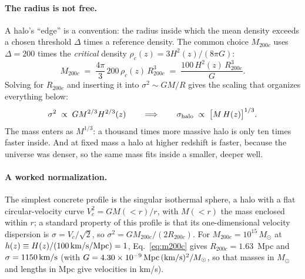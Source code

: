 \documentclass[11pt]{article}
\newcommand{\shalo}{\sigma_{\rm halo}}
\newcommand{\Msun}{M_\odot}
\newcommand{\kms}{\,{\rm km/s}}
\begin{document}
\paragraph{The radius is not free.}
A halo's ``edge'' is a convention: the radius inside which the mean
density exceeds a chosen threshold $\Delta$ times a reference density.
The common choice $M_{200c}$ uses $\Delta = 200$ times the
\emph{critical} density $\rho_c(z) = 3 H^2(z)/(8\pi G)$:
\begin{equation}
  M_{200c} \;=\; \frac{4\pi}{3}\,200\,\rho_c(z)\,R_{200c}^3
  \;=\; \frac{100\,H^2(z)\,R_{200c}^3}{G} .
  \label{eq:m200c}
\end{equation}
Solving for $R_{200c}$ and inserting it into $\sigma^2 \sim GM/R$
gives the scaling that organizes everything below:
\begin{equation}
  \sigma^2 \;\propto\; G M^{2/3} H^{2/3}(z)
  \qquad\Longrightarrow\qquad
  \shalo \;\propto\; \bigl[M\,H(z)\bigr]^{1/3} .
  \label{eq:scaling}
\end{equation}
The mass enters as $M^{1/3}$: a thousand times more massive halo is
only ten times faster inside.  And at fixed mass a halo at higher
redshift is faster, because the universe was denser, so the same mass
fits inside a smaller, deeper well.

\paragraph{A worked normalization.}
The simplest concrete profile is the singular isothermal sphere, a
halo with a flat circular-velocity curve $V_c^2 = G M(<r)/r$, with
$M(<r)$ the mass enclosed within $r$; a standard property of this
profile is that its
one-dimensional velocity dispersion is $\sigma = V_c/\sqrt{2}$, so
$\sigma^2 = G M_{200c}/(2 R_{200c})$.  For
$M_{200c} = 10^{15}\,\Msun$ at $h(z) \equiv H(z)/(100\kms/{\rm Mpc})
= 1$, Eq.~\eqref{eq:m200c} gives $R_{200c} = 1.63$~Mpc and
$\sigma = 1150\kms$ (with
$G = 4.30 \times 10^{-9}\,{\rm Mpc}\,({\rm km/s})^2/\Msun$, so that
masses in $\Msun$ and lengths in Mpc give velocities in km/s).
\end{document}
